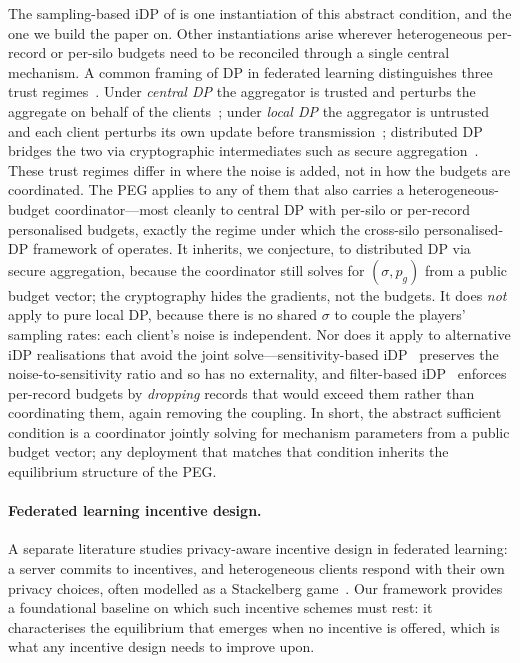 The sampling-based iDP of \citet{boenisch2023have} is one instantiation
of this abstract condition, and the one we build the paper on. Other
instantiations arise wherever heterogeneous per-record or per-silo
budgets need to be reconciled through a single central mechanism. A
common framing of DP in federated learning distinguishes three trust
regimes~\cite{kairouz2021advances}. Under \emph{central DP} the
aggregator is trusted and perturbs the aggregate on behalf of the
clients~\cite{geyer2017differentially}; under \emph{local DP} the
aggregator is untrusted and each client perturbs its own update before
transmission~\cite{truex2020ldp}; distributed DP bridges the two via
cryptographic intermediates such as secure
aggregation~\cite{bonawitz2017practical}. These trust regimes differ in
where the noise is added, not in how the budgets are coordinated. The
PEG applies to any of them that also carries a heterogeneous-budget
coordinator---most cleanly to central DP with per-silo or per-record
personalised budgets, exactly the regime under which the cross-silo
personalised-DP framework of \citet{liu2024crosssilo} operates. It
inherits, we conjecture, to distributed DP via secure aggregation,
because the coordinator still solves for $(\sigma, p_g)$ from a public
budget vector; the cryptography hides the gradients, not the budgets.
It does \emph{not} apply to pure local DP, because there is no shared
$\sigma$ to couple the players' sampling rates: each client's noise is
independent. Nor does it apply to alternative iDP realisations that
avoid the joint solve---sensitivity-based iDP~\cite{boenisch2023have}
preserves the noise-to-sensitivity ratio and so has no
externality, and filter-based iDP~\cite{feldman2021individual} enforces
per-record budgets by \emph{dropping} records that would exceed them
rather than coordinating them, again removing the coupling. In short,
the abstract sufficient condition is a coordinator jointly solving for
mechanism parameters from a public budget vector; any deployment that
matches that condition inherits the equilibrium structure of the PEG.

\paragraph{Federated learning incentive design.}
A separate literature studies privacy-aware incentive design in federated
learning: a server commits to incentives, and heterogeneous clients respond
with their own privacy choices, often modelled as a Stackelberg
game~\cite{li2024fedpcs, donahue2021optimality, tu2025idhfl, ma2024evolutionary}.
Our framework provides a foundational baseline on which such incentive
schemes must rest: it characterises the equilibrium that emerges when no
incentive is offered, which is what any incentive design needs to improve
upon.


